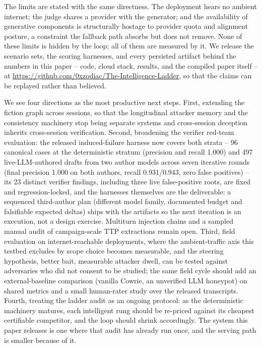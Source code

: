 The limits are stated with the same directness. The deployment hears no ambient
internet; the judge shares a provider with the generator; and the
availability of generative components is structurally hostage to provider
quota and alignment posture, a constraint the fallback path absorbs but
does not remove. None of these limits is hidden by the loop; all of them
are measured by it. We release the scenario sets, the scoring harnesses,
and every persisted artifact behind the numbers in this paper -- code,
cloud stack, results, and the compiled paper itself -- at
\url{https://github.com/0xzodiac/The-Intelligence-Ladder}, so that the
claims can be replayed rather than believed.

We see four directions as the most productive next steps. First, extending the fiction
graph across sessions, so that the longitudinal attacker memory and the
consistency machinery stop being separate systems and cross-session
deception inherits cross-session verification. Second, broadening the verifier red-team
evaluation: the released induced-failure harness now covers both
strata -- 96 canonical cases at the deterministic stratum (precision
and recall 1.000) and 497 live-LLM-authored drafts from two author
models across seven iterative rounds (final precision 1.000 on both
authors, recall 0.931/0.943, zero false positives) -- its 23
distinct verifier findings, including three live false-positive
roots, are fixed and regression-locked, and the harnesses themselves
are the deliverable: a sequenced third-author plan (different model
family, documented budget and falsifiable expected deltas) ships with
the artifacts so the next iteration is an execution, not a design
exercise. Multiturn injection chains and a sampled manual audit of
campaign-scale TTP extractions remain open. Third, field evaluation on
internet-reachable deployments, where the ambient-traffic axis this
testbed excludes by scope choice becomes measurable, and the steering
hypothesis, better bait, measurable attacker dwell, can be tested against
adversaries who did not consent to be studied; the same field cycle
should add an external-baseline comparison (vanilla Cowrie, an
unverified LLM honeypot) on shared metrics and a small human-rater
study over the released transcripts. Fourth, treating the ladder
audit as an ongoing protocol: as the deterministic machinery matures,
each intelligent rung should be re-priced against its cheapest
certifiable competitor, and the loop should shrink accordingly. The
system this paper releases is one where that audit has already run once,
and the serving path is smaller because of it.
